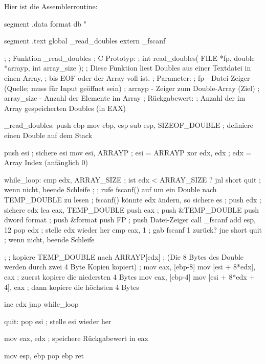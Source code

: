 Hier ist die Assemblerroutine:
\begin{AsmCodeListing}[label=read.asm, numbers=left, commandchars=\\\{\}]
 segment .data
 format  db      "%

 segment .text
         global  _read_doubles
         extern  _fscanf


 ;
 ; Funktion _read_doubles
 ; C Prototyp:
 ;   int read_doubles( FILE *fp, double *arrayp, int array_size );
 ; Diese Funktion liest Doubles aus einer Textdatei in einen Array,
 ; bis EOF oder der Array voll ist.
 ; Parameter:
 ;   fp         - Datei-Zeiger (Quelle; muss f\"{u}r Input ge\"{o}ffnet sein)
 ;   arrayp     - Zeiger zum Double-Array (Ziel)
 ;   array_size - Anzahl der Elemente im Array
 ; R\"{u}ckgabewert:
 ;   Anzahl der im Array gespeicherten Doubles (in EAX)

 _read_doubles:
         push    ebp
         mov     ebp, esp
         sub     esp, SIZEOF_DOUBLE  ; definiere einen Double auf dem Stack

         push    esi                 ; sichere esi
         mov     esi, ARRAYP         ; esi = ARRAYP
         xor     edx, edx            ; edx = Array Index (anf\"{a}nglich 0)

 while_loop:
         cmp     edx, ARRAY_SIZE     ; ist edx < ARRAY_SIZE ?
         jnl     short quit          ; wenn nicht, beende Schleife
 ;
 ; rufe fscanf() auf um ein Double nach TEMP_DOUBLE zu lesen
 ; fscanf() k\"{o}nnte edx \"{a}ndern, so sichere es
 ;
         push    edx                 ; sichere edx
         lea     eax, TEMP_DOUBLE
         push    eax                 ; push &TEMP_DOUBLE
         push    dword format        ; push &format
         push    FP                  ; push Datei-Zeiger
         call    _fscanf
         add     esp, 12
         pop     edx                 ; stelle edx wieder her
         cmp     eax, 1              ; gab fscanf 1 zur\"{u}ck?
         jne     short quit          ; wenn nicht, beende Schleife

 ;
 ; kopiere TEMP_DOUBLE nach ARRAYP[edx]
 ; (Die 8 Bytes des Double werden durch zwei 4 Byte Kopien kopiert)
 ;
         mov     eax, [ebp-8]
         mov     [esi + 8*edx], eax  ; zuerst kopiere die niedersten 4 Bytes
         mov     eax, [ebp-4]
         mov     [esi + 8*edx + 4], eax ; dann kopiere die h\"{o}chsten 4 Bytes

         inc     edx
         jmp     while_loop

 quit:
         pop     esi                 ; stelle esi wieder her

         mov     eax, edx            ; speichere R\"{u}ckgabewert in eax

         mov     esp, ebp
         pop     ebp
         ret
\end{AsmCodeListing}

